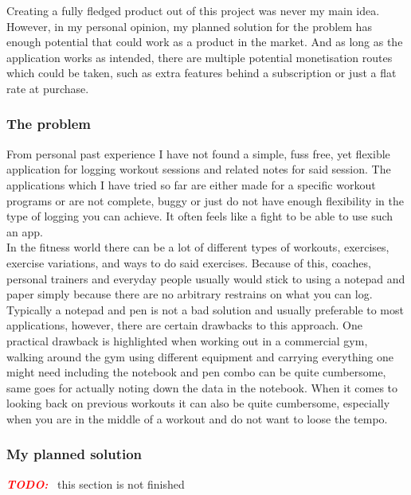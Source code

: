 \documentclass{article}
\newcommand{\vspaceconst}{-2ex}
\newcommand{\TODO}{\textbf{\textit{\textcolor{red}{TODO:}}} }
\begin{document}
\begin{multicols}{2}
Creating a fully fledged product out of this project was never my main idea. However, in my personal opinion, my planned solution for the problem has enough potential that could work as a product in the market. And as long as the application works as intended, there are multiple potential monetisation routes which could be taken, such as extra features behind a subscription or just a flat rate at purchase.

\subsubsection{The problem}
\vspace{\vspaceconst}

From personal past experience I have not found a simple, fuss free, yet flexible application for logging workout sessions and related notes for said session. The applications which I have tried so far are either made for a specific workout programs or are not complete, buggy or just do not have enough flexibility in the type of logging you can achieve. It often feels like a fight to be able to use such an app.\\
In the fitness world there can be a lot of different types of workouts, exercises, exercise variations, and ways to do said exercises. Because of this, coaches, personal trainers and everyday people usually would stick to using a notepad and paper  simply because there are no arbitrary restrains on what you can log.\\
Typically a notepad and pen is not a bad solution and usually preferable to most applications, however, there are certain drawbacks to this approach. One practical drawback is highlighted when working out in a commercial gym, walking around the gym using different equipment and carrying everything one might need including the notebook and pen combo can be quite cumbersome, same goes for actually noting down the data in the notebook. When it comes to looking back on previous workouts it can also be quite cumbersome, especially when you are in the middle of a workout and do not want to loose the tempo.\\

\subsubsection{My planned solution}
\vspace{\vspaceconst}
\TODO~this section is not finished\\


\end{multicols}
\end{document}
